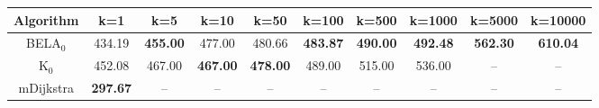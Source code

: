 \begin{tabular}{c|ccccccccc}\toprule
Algorithm & k=1 & k=5 & k=10 & k=50 & k=100 & k=500 & k=1000 & k=5000 & k=10000 \\ \midrule
BELA$_0$ & 434.19 & \textbf{455.00} & 477.00 & 480.66 & \textbf{483.87} & \textbf{490.00} & \textbf{492.48} & \textbf{562.30} & \textbf{610.04} \\
K$_0$ & 452.08 & 467.00 & \textbf{467.00} & \textbf{478.00} & 489.00 & 515.00 & 536.00 & -- & -- \\
mDijkstra & \textbf{297.67} & -- & -- & -- & -- & -- & -- & -- & -- \\ \bottomrule 
\end{tabular}
